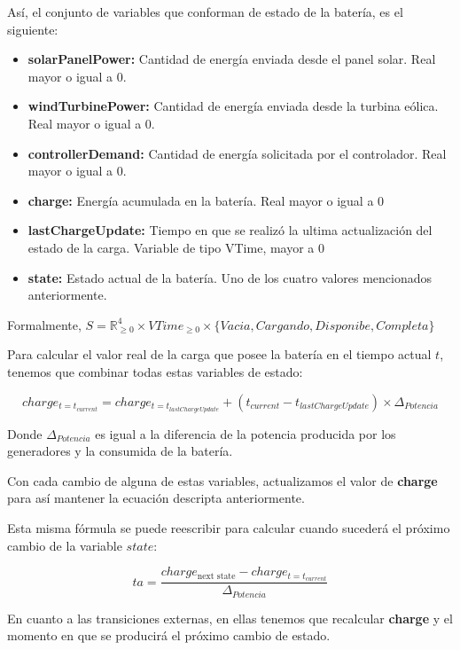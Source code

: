 Así, el conjunto de variables que conforman de estado de la batería, es el siguiente:

\begin{itemize}
    \item \textbf{solarPanelPower:} Cantidad de energía enviada desde el panel solar.  Real mayor o igual a 0.
    \item \textbf{windTurbinePower:} Cantidad de energía enviada desde la turbina eólica.  Real mayor o igual a 0.
    \item \textbf{controllerDemand:} Cantidad de energía solicitada por el controlador. Real mayor o igual a 0.
    \item \textbf{charge:} Energía acumulada en la batería. Real mayor o igual a 0
    \item \textbf{lastChargeUpdate:} Tiempo en que se realizó la ultima actualización del estado de la carga.
    Variable de tipo VTime, mayor a 0
    \item \textbf{state:} Estado actual de la batería. Uno de los cuatro valores mencionados anteriormente.
\end{itemize}

Formalmente, $S = \mathbb{R}_{\geq 0}^4 \times VTime_{\geq 0} \times \{Vacia, Cargando, Disponibe, Completa\}$ 

Para calcular el valor real de la carga que posee la batería en el tiempo actual $t$, 
tenemos que combinar todas estas variables de estado:

$$charge_{t=t_{current}} = charge_{t=t_{lastChargeUpdate}}+(t_{current} - t_{lastChargeUpdate}) \times \Delta_{Potencia}$$

Donde $\Delta_{Potencia}$ es igual a la diferencia de la potencia producida por los generadores y la consumida
de la batería.

Con cada cambio de alguna de estas variables, actualizamos el valor de \textbf{charge} para así
mantener la ecuación descripta anteriormente.

Esta misma fórmula se puede reescribir para calcular cuando sucederá el próximo cambio de la variable $state$:

$$ta = \frac{charge_{\text{next state}} - charge_{t=t_{current}}}{\Delta_{Potencia}}$$

En cuanto a las transiciones externas, en ellas tenemos que recalcular \textbf{charge} y el momento en que se
producirá el próximo cambio de estado.


